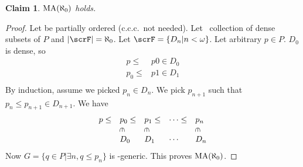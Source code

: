 \documentclass[11pt,pdftex,twoside,a4paper]{article}
\newcommand{\MA}{\ensuremath{\mathop{\rm MA}\nolimits}}
\newcommand{\ccc}{c.c.c.}
\newcommand{\crotin}{\rotatebox[origin=c]{-90}{\(\in\)}}
\newtheorem{claim}[thm]{Claim}
\begin{document}
\begin{claim}
\(\MA(\aleph_0)\) holds.
\end{claim}
\begin{proof}
Let  be partially ordered (\ccc\ not needed).
Let \scrF\ collection of dense subsets of $P$
and \(|\scrF| = \aleph_0\). Let \(\scrF = \{D_n| n < \omega\}\).
Let arbitrary \(p\in P\).  \(D_0\) is dense, so 
\begin{align*}
p \leq & p0 \in D_0 \\
p_0 \leq & p1 \in D_1 \\
\end{align*}
By induction, assume we picked \(p_n \in D_n\).
We pick \(p_{n+1}\) such that \(p_n \leq p_{n+1} \in D_{n+1}\).
We have 
\begin{equation*}
\begin{array}{lllll}
p \leq & p_0 \leq & p_1 \leq &\cdots \leq & p_n \\
       &\crotin   &\crotin   &            & \crotin \\
       & D_0      & D_1      &\cdots      & D_n
\end{array}
\end{equation*}
Now \(G = \{q \in P |\exists n, q \leq p_n\}\) is \scrF-generic.
This proves \(\MA(\aleph_0)\).
\end{proof}
\end{document}
